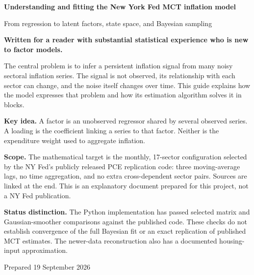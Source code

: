 \documentclass[11pt,a4paper]{article}
\newcommand{\takeaway}[1]{\par\medskip\noindent\colorbox{pale}{\parbox{\dimexpr\linewidth-2\fboxsep}{\textbf{Key idea.} #1}}\par\medskip}
\begin{document}
\hypersetup{pageanchor=false}
\begin{titlepage}
\vspace*{18mm}
{\color{ink}\Huge\bfseries Understanding and fitting the New York Fed MCT inflation model\par}
\vspace{9mm}
{\Large From regression to latent factors, state space, and Bayesian sampling\par}
\vspace{10mm}
\textbf{Written for a reader with substantial statistical experience who is new to factor models.}

The central problem is to infer a persistent inflation signal from many noisy sectoral inflation series. The signal is not observed, its relationship with each sector can change, and the noise itself changes over time. This guide explains how the model expresses that problem and how its estimation algorithm solves it in blocks.

\takeaway{A factor is an unobserved regressor shared by several observed series. A loading is the coefficient linking a series to that factor. Neither is the expenditure weight used to aggregate inflation.}

\textbf{Scope.} The mathematical target is the monthly, 17-sector configuration selected by the NY Fed's publicly released PCE replication code: three moving-average lags, no time aggregation, and no extra cross-dependent sector pairs. Sources are linked at the end. This is an explanatory document prepared for this project, not a NY Fed publication.

\textbf{Status distinction.} The Python implementation has passed selected matrix and Gaussian-smoother comparisons against the published code. These checks do not establish convergence of the full Bayesian fit or an exact replication of published MCT estimates. The newer-data reconstruction also has a documented housing-input approximation.

\vfill
{\large Prepared 19 September 2026\par}
\end{titlepage}
\hypersetup{pageanchor=true}
\tableofcontents
\newpage
\end{document}
